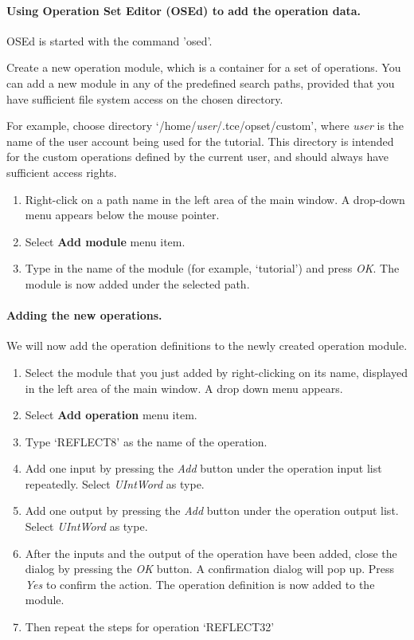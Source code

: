 \documentclass[twoside]{tceusermanual}
\begin{document}
\paragraph{Using Operation Set Editor (OSEd) to add the operation data.}

OSEd is started with the command 'osed'.

Create a new operation module, which is a container for a set of operations.
You can add a new module in any of the predefined search paths, provided
that you have sufficient file system access on the chosen directory.

For example, choose directory `/home/\emph{user}/.tce/opset/custom', where
\emph{user} is the name of the user account being used for the tutorial.
This directory is intended for the custom operations defined by the
current user, and should always have sufficient access rights.

\begin{enumerate}
\item%
  Right-click on a path name in the left area of the main window.  A
  drop-down menu appears below the mouse pointer.
\item%
  Select \textbf{Add module} menu item. 
\item%
  Type in the name of the module (for example, `tutorial') and press \emph{OK}.
  The module is now added under the selected path.
\end{enumerate} 

\paragraph{Adding the new operations.} We will now add the operation
definitions to the newly created operation module.

\begin{enumerate}
\item%
  Select the module that you just added by right-clicking on its name,
  displayed in the left area of the main window. A drop down menu appears.
\item%
  Select \textbf{Add operation} menu item.
\item%
  Type `REFLECT8' as the name of the operation.
\item%
  Add one input by pressing the \emph{Add} button under the operation input
  list repeatedly. Select \textit{UIntWord} as type.
\item%
  Add one output by pressing the \emph{Add} button under the operation output
  list. Select \textit{UIntWord} as type.
\item%
  After the inputs and the output of the operation have been added, close
  the dialog by pressing the \emph{OK} button. A confirmation dialog will pop
  up. Press \emph{Yes} to confirm the action. The operation definition is
  now added to the module.
\item%
  Then repeat the steps for operation `REFLECT32'
\end{enumerate}
\end{document}
